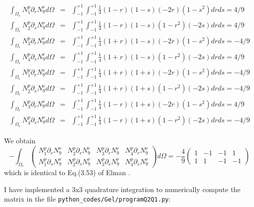 \begin{tiny}
\begin{eqnarray}
\int_{\Omega_e}  N_1^p \partial_r N_9^\upnu d\Omega &=&  
\int_{-1}^{+1}\int_{-1}^{+1}\frac{1}{4}(1-r)(1-s)    (-2r)(1-s^2)  drds = 4/9 \\
\int_{\Omega_e}  N_2^p \partial_s N_9^\upnu d\Omega &=&  
\int_{-1}^{+1}\int_{-1}^{+1}\frac{1}{4}(1-r)(1-s)    (1-r^2)(-2s)  drds = 4/9 \\
\int_{\Omega_e}  N_3^p \partial_r N_9^\upnu d\Omega &=&  
\int_{-1}^{+1}\int_{-1}^{+1}\frac{1}{4}(1+r)(1-s)    (-2r)(1-s^2)  drds = -4/9 \\
\int_{\Omega_e}  N_4^p \partial_s N_9^\upnu d\Omega &=&  
\int_{-1}^{+1}\int_{-1}^{+1}\frac{1}{4}(1+r)(1-s)    (1-r^2)(-2s)  drds = 4/9 \\
\int_{\Omega_e}  N_1^p \partial_r N_9^\upnu d\Omega &=&  
\int_{-1}^{+1}\int_{-1}^{+1}\frac{1}{4}(1+r)(1+s)    (-2r)(1-s^2)  drds = -4/9 \\
\int_{\Omega_e}  N_2^p \partial_s N_9^\upnu d\Omega &=&  
\int_{-1}^{+1}\int_{-1}^{+1}\frac{1}{4}(1+r)(1+s)    (1-r^2)(-2s)  drds = -4/9  \\
\int_{\Omega_e}  N_3^p \partial_r N_9^\upnu d\Omega &=&  
\int_{-1}^{+1}\int_{-1}^{+1}\frac{1}{4}(1-r)(1+s)    (-2r)(1-s^2)  drds = 4/9 \\
\int_{\Omega_e}  N_4^p \partial_s N_9^\upnu d\Omega &=&  
\int_{-1}^{+1}\int_{-1}^{+1}\frac{1}{4}(1-r)(1+s)    (1-r^2)(-2s)  drds = -4/9 
\end{eqnarray}
\end{tiny}


We obtain 
\[
-\int_{\Omega_e}
\left(
\begin{array}{cccc}
N_1^p\partial_r N_9^\upnu & N_2^p\partial_r N_9^\upnu & N_3^p\partial_r N_9^\upnu & N_4^p\partial_r N_9^\upnu \\
N_1^p\partial_s N_9^\upnu & N_2^p\partial_s N_9^\upnu & N_3^p\partial_s N_9^\upnu & N_4^p\partial_s N_9^\upnu 
\end{array}
\right)
d\Omega 
=
- \frac{4}{9}
\left(
\begin{array}{cccc}
1 &-1 &-1 &1 \\
1 &1 &-1 &-1 
\end{array}
\right)
\]
which is identical to Eq.(3.53) of Elman \etal \cite{elsw}.


I have implemented a 3x3 quadrature integration to numerically compute the matrix 
in the file {\tt python\_codes/Gel/programQ2Q1.py}:
 
